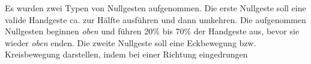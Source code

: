 Es wurden zwei Typen von Nullgesten aufgenommen. Die erste Nullgeste soll eine valide Handgeste ca. zur Hälfte ausführen und dann umkehren. Die aufgenommen Nullgesten beginnen \textit{oben} und führen
20\% bis 70\% der Handgeste aus, bevor sie wieder \textit{oben} enden. Die zweite Nullgeste soll eine Eckbewegung bzw. Kreisbewegung darstellen, indem bei einer Richtung eingedrungen
